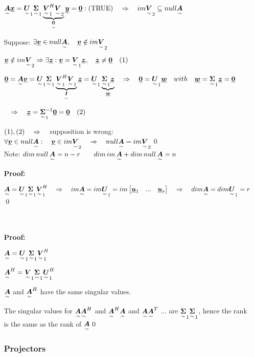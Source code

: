 $\ma{A}\vec{x}=\ma{U}_1\ma{\Sigma}_1\underbrace{\ma{V}_1^H\ma{V}_2}_{\ma{0}}\vec{y}=\vec{0}: (\textrm{TRUE}) \quad\Rightarrow \quad  im\ma{V}_2\subseteq null\ma{A}$

Suppose: $\exists \vec{v}\in null\ma{A},\quad\vec{v}\notin im\ma{V}_2$

$\vec{v}\notin im\ma{V}_2 \Rightarrow \exists \vec{z}:\vec{v}=\ma{V}_1\vec{z},\quad \vec{z}\neq\vec{0}\quad(1)$

$\vec{0}=\ma{A}\vec{v}=\ma{U}_1\ma{\Sigma}_1\underbrace{\ma{V}_1^H\ma{V}_1}_{\ma{I}}\vec{z}=\ma{U}_1\underbrace{\ma{\Sigma}_1\vec{z}}_{\vec{w}}
\pfeil \vec{0}=\ma{U}_1\vec{w} \quad with\quad \vec{w}=\ma{\Sigma}_1\vec{z}=\vec{0}$

$\pfeil \vec{z}=\ma{\Sigma}_1^{-1}\vec{0}=\vec{0} \quad(2)$ 

$(1),(2)\pfeil $ supposition is wrong: $\forall\vec{v}\in null \ma{A}: \quad \vec{v}\in im\ma{V}_2 \pfeil null\ma{A}=im\ma{V}_2$\qed\\
Note: $dim\,null\,\ma{A}=n-r \qquad dim\,im\,\ma{A} + dim\,null\,\ma{A} =n$\\




\textbf{Proof: }

$\ma{A}=\ma{U}_1\ma{\Sigma}_1\ma{V}_1^H \pfeil im\ma{A}=im\ma{U}_1=im\mat{\vec{u}_1&...&\vec{u}_r}\pfeil dim\ma{A}=dim\ma{U}_1=r$ \qed

\\ \ \\

\textbf{Proof: }

$\ma{A}=\ma{U}_1\ma{\Sigma}_1\ma{V}_1^H$

$\ma{A}^H=\ma{V}_1\ma{\Sigma}_1\ma{U}_1^H$

$\ma{A}$ and $\ma{A}^H$ have the same singular values. 

\pfeil The singular values for $\ma{A}\ma{A}^H$ and $\ma{A}^H\ma{A}$ and $\ma{A}\ma{A}^T$ ... are $\ma{\Sigma}_1\ma{\Sigma}_1$, hence the rank is the same as the rank of  $\ma{A}$\qed

\subsubsection{Projectors}

